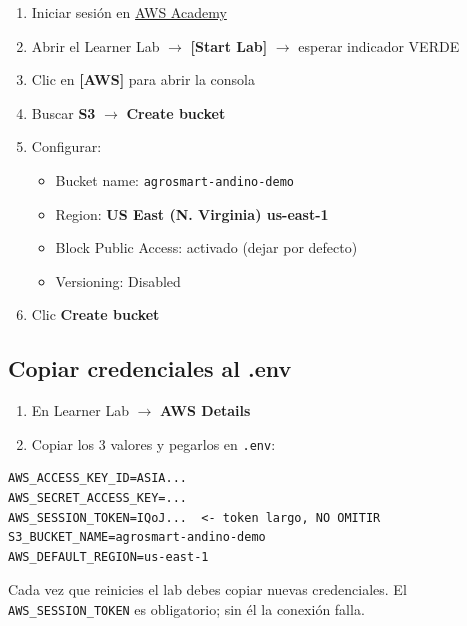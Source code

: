 \documentclass[11pt,a4paper]{article}
\begin{document}
\begin{awsbox}
\begin{enumerate}
  \item Iniciar sesi\'on en \href{https://awsacademy.instructure.com}{AWS Academy}
  \item Abrir el Learner Lab $\to$ \textbf{[Start Lab]} $\to$ esperar indicador VERDE
  \item Clic en \textbf{[AWS]} para abrir la consola
  \item Buscar \textbf{S3} $\to$ \textbf{Create bucket}
  \item Configurar:
  \begin{itemize}
    \item Bucket name: \texttt{agrosmart-andino-demo}
    \item Region: \textbf{US East (N. Virginia) us-east-1}
    \item Block Public Access: activado (dejar por defecto)
    \item Versioning: Disabled
  \end{itemize}
  \item Clic \textbf{Create bucket}
\end{enumerate}
\end{awsbox}

\subsection{Copiar credenciales al .env}

\begin{awsbox}
\begin{enumerate}
  \item En Learner Lab $\to$ \textbf{AWS Details}
  \item Copiar los 3 valores y pegarlos en \texttt{.env}:
\end{enumerate}
\begin{lstlisting}
AWS_ACCESS_KEY_ID=ASIA...
AWS_SECRET_ACCESS_KEY=...
AWS_SESSION_TOKEN=IQoJ...  <- token largo, NO OMITIR
S3_BUCKET_NAME=agrosmart-andino-demo
AWS_DEFAULT_REGION=us-east-1
\end{lstlisting}
\end{awsbox}

\begin{alertbox}
Cada vez que reinicies el lab debes copiar nuevas credenciales. El
\texttt{AWS\_SESSION\_TOKEN} es obligatorio; sin \'el la conexi\'on falla.
\end{alertbox}
\end{document}
